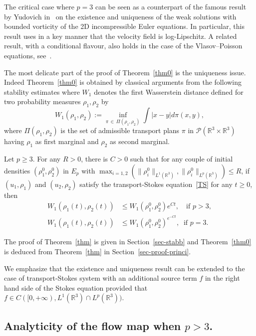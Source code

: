 \documentclass[AHL,Unicode,longabstracts,published]{cedram}
\newcommand{\R}{\mathbb{R}}
\newcommand{\clP}{\mathcal{P}}
\renewcommand{\leq}{\leqslant}
\renewcommand{\geq}{\geqslant}
\begin{document}
\begin{rema}\label{analog}
The critical case where $p=3$ can be seen as a counterpart of the famous result by Yudovich in~\cite{Yudovich63} on the existence and uniqueness of the weak solutions with bounded vorticity of the 2D incompressible Euler equations. In particular, this result uses in a key manner that the velocity field is log-Lipschitz. A related result, with a conditional flavour, also holds in the case of the Vlasov--Poisson equations, see~\cite{Loeper}.
\end{rema} The most delicate part of the proof of Theorem~\ref{thm0} is the uniqueness issue. Indeed Theorem~\ref{thm0} is obtained by classical arguments from the following stability estimates where $W_1$ denotes the first Wasserstein distance defined for two probability measures $\rho_1,\rho_2 $ by
\[
W_1 (\rho_1,\rho_2) :=
\underset{\pi\,\in\,\Pi(\rho_1,\rho_2)} \inf \int |x-y| d\pi(x,y),
\]
where $\Pi(\rho_1,\rho_2)$ is the set of admissible transport plans $\pi $ in $\clP(\R^3\times \R^3)$ having $\rho_1$ as first marginal and $\rho_2$ as second marginal.
\begin{theo} \label{thm}
Let $p\geq 3$. For any $R>0$, there is $C>0$ such that for any couple of initial densities $ (\rho_1^0, \rho_2^0)$ in $E_p $ with $ \max_{i=1,2} (\|\rho_i^0\|_{ L^1 (\R^3) },\|\rho_i^0\|_{ L^p (\R^3) }) \leq R$, if $ (u_1,\rho_1) $ and $ (u_2,\rho_2)$ satisfy the transport-Stokes equation~\eqref{TS} for any $t\geq 0$, then
\begin{align}
W_1(\rho_1(t),\rho_2(t)) &\leq W_1(\rho_1^0,\rho_2^0)e^{C t}, \quad \text{if } p > 3,\label{sta-geq-3}
\\ 
W_1 (\rho_1(t),\rho_2(t)) &\leq W_1(\rho_1^0,\rho_2^0)^{e^{-C t}}, \;\; \text{if } p = 3.\label{sta-geq-critik}
\end{align}
\end{theo}

The proof of Theorem~\ref{thm} is given in Section~\ref{sec-stabb} and Theorem~\ref{thm0} is deduced from Theorem~\ref{thm} in Section~\ref{sec-proof-princi}.

\begin{rema}\label{rem:TS_avec_terme_source}
We emphasize that the existence and uniqueness result can be extended to the case of transport-Stokes system with an additional source term $f$ in the right hand side of the Stokes equation provided that $f \in C([0,+\infty), L^1(\R^3) \cap L^p(\R^3))$.
\end{rema}


\subsection{Analyticity of the flow map when \texorpdfstring{$p > 3$}{p>3}.}
\end{document}
